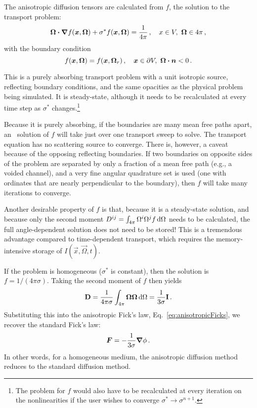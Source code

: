 The anisotropic diffusion tensors are calculated from $f$, the solution to the
transport problem:
\begin{equation*}
    \bm{\Omega}\bm{\cdot} \bm{\nabla} f(\bm{x}, \bm{\Omega})
    + \sigma^\ast f (\bm{x}, \bm{\Omega})
  = \frac{1}{4\pi} \,, \quad x \in V,\ \bm{\Omega} \in 4\pi\,,
\end{equation*}
with the boundary condition
\begin{equation*}
  f(\bm{x}, \bm{\Omega}) = f(\bm{x}, \bm{\Omega}_r) \,,
 \quad \bm{x} \in \partial V, \ \bm{\Omega} \bm{\cdot} \bm{n} < 0\,.
\end{equation*}

This is a purely absorbing transport problem with a unit isotropic source,
reflecting boundary conditions, and the same opacities as the physical problem
being simulated. It is steady-state, although it needs to be recalculated at
every time step as $\sigma^*$ changes.\footnote{The problem for $f$ would also
have to be recalculated at every iteration on the nonlinearities if the user
wishes to converge $\sigma^* \to \sigma^{n+1}$.}

Because it is purely absorbing, if the boundaries are many mean free paths
apart, an \SN\ solution of $f$ will take just over one transport sweep to
solve.
The transport equation has no scattering source to converge.
There is, however, a caveat because of the opposing reflecting boundaries. If
two boundaries on opposite sides of the problem are separated by only a
fraction of a mean free path (e.g., a voided channel), and a very fine angular
quadrature set is used (one with ordinates that are nearly perpendicular to the
boundary), then $f$ will take many iterations to converge.

Another desirable property of $f$ is that, because it is a steady-state
solution, and because only the second moment
$D^{ij}=\int_{4\pi} \Omega^i \Omega^j f \mathop{}\!\mathrm{d}\Omega$ needs to be calculated, the
full angle-dependent solution does not need to be stored! This is a tremendous
advantage compared to time-dependent transport, which requires the
memory-intensive storage of $I(\vec{x},\vec{\Omega},t)$.

If the problem is homogeneous ($\sigma^*$ is constant), then the solution is
$f=1/(4\pi\sigma)$. Taking the second moment of $f$ then yields
\begin{equation*}
  \mathbf{D} = \frac{1}{4\pi\sigma} \int_{4\pi} \bm{\Omega} \bm{\Omega} \mathop{}\!\mathrm{d} \Omega
  = \frac{1}{3\sigma} \mathbf{I}\,.
\end{equation*}
Substituting this into the anisotropic Fick's law,
Eq.~\eqref{eq:anisotropicFicks}, we recover the standard Fick's law:
\begin{equation*}
  \bm{F} = - \frac{1}{3\sigma} \bm{\nabla} \phi\,.
\end{equation*}
In other words, for a homogeneous medium, the anisotropic diffusion method
reduces to the standard diffusion method.

